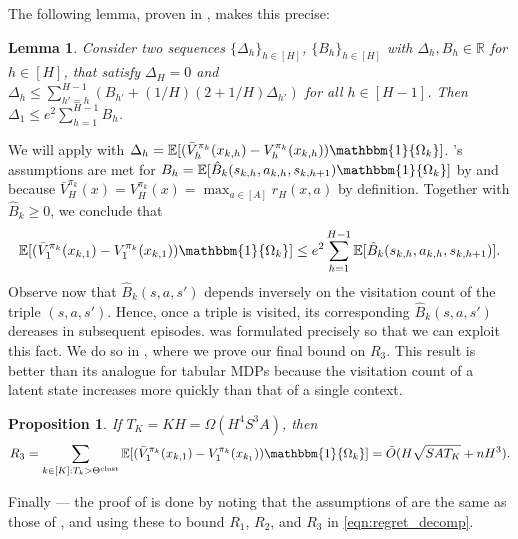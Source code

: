 \documentclass[11pt]{article}
\newcommand{\mbb}[1]{\mathbbm{#1}}
\newcommand{\mbbE}{\mathbb{E}}
\newcommand{\mbbR}{\mathbb{R}}
\newcommand{\clust}{\textnormal{clust}}
\newtheorem{lemma}[theorem]{Lemma}
\newtheorem{proposition}[theorem]{Proposition}
\theoremstyle{definition}
\theoremstyle{definition}
\begin{document}
The following lemma, proven in , makes this precise:
\begin{lemma}
	\label{lem:recursive_sum}
	Consider two sequences $\{\Delta_h\}_{h\in[H]}$, $\{B_h\}_{h\in[H]}$ with $\Delta_h,B_h\in\mbbR$ for $h\in[H]$, that satisfy $\Delta_H=0$ and $\Delta_h \leq \sum_{h'=h}^{H-1}(B_{h'} + (1/H)(2+1/H)\Delta_{h'})$ for all $h\in[H-1]$.
	Then $\Delta_1\leq e^2\sum_{h=1}^{H-1}B_{h}$.
\end{lemma}
We will apply  with $\Delta_h=\mbbE[ (\bar{V}_h^{\pi_k}(x_{k,h})-V_h^{\pi_k}(x_{k,h}))\mathbbm{1}\{\Omega_k\} ]$.
's assumptions are met for $B_h = \mbbE[\hat{B}_{k}(s_{k,h},\allowbreak a_{k,h},\allowbreak s_{k,h+1})\mathbbm{1}\{\Omega_k\}]$ by  and because $\bar{V}^{\pi_k}_H(x)=V^{\pi_k}_H(x)=\max_{a\in[A]}r_H(x,a)$ by definition.
Together with $\hat{B}_k\geq 0$, we conclude that
\begin{equation}
	\label{eqn:application_of_recursive_sum_lemma}
	\mbbE[ (\bar{V}_1^{\pi_k}(x_{k,1})-V_1^{\pi_k}(x_{k,1}))\mathbbm{1}\{\Omega_k\} ]
	\leq
	e^2\sum_{h=1}^{H-1}\mbbE[
		\hat{B}_{k}(s_{k,h},a_{k,h},s_{k,h+1})
	]
	.
\end{equation}
Observe now that $\hat{B}_k(s,a,s')$ depends inversely on the visitation count of the triple $(s,a,s')$.
Hence, once a triple is visited, its corresponding $\hat{B}_k(s,a,s')$ dereases in subsequent episodes.
 was formulated precisely so that we can exploit this fact.
We do so in , where we prove our final bound on $R_3$.
This result is better than its analogue for tabular \glspl{MDP} because the visitation count of a latent state increases more quickly than that of a single context.
\begin{proposition}
	\label{prop:final_bound_R3}
	If $T_K=KH= \Omega(H^4S^3A)$, then
	\begin{equation}
		\label{eqn:final_bound_R3}
		\begin{split}
			R_3
			=
			\sum_{k\in[K]:T_k>\Theta^{\clust}}\mbbE[(\bar{V}^{\pi_k}_1(x_{k,1})-V^{\pi_k}_1(x_{k_1}))\mbb{1}\{\Omega_k\}]
			=
			\tilde{O}(
			H\sqrt{SAT_K}
			+
			nH^3
			)
			.
		\end{split}
	\end{equation}
\end{proposition}

Finally --- the proof of  is done by noting that the assumptions of  are the same as those of , and using these to bound $R_1$, $R_2$, and $R_3$ in \eqref{eqn:regret_decomp}.
\end{document}
